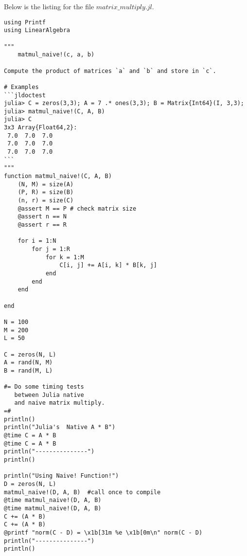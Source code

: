 \documentclass[a4paper,10pt,BCOR10mm,oneside,headsepline]{scrartcl}
\begin{document}
    


\newpage 
\noindent Below is the listing for the file $matrix\_multiply.jl$.

\begin{lstlisting}
using Printf
using LinearAlgebra

"""
    matmul_naive!(c, a, b)

Compute the product of matrices `a` and `b` and store in `c`.

# Examples
```jldoctest
julia> C = zeros(3,3); A = 7 .* ones(3,3); B = Matrix{Int64}(I, 3,3);
julia> matmul_naive!(C, A, B)
julia> C
3x3 Array{Float64,2}:
 7.0  7.0  7.0
 7.0  7.0  7.0
 7.0  7.0  7.0
```
"""
function matmul_naive!(C, A, B)
    (N, M) = size(A)
    (P, R) = size(B)
    (n, r) = size(C)
    @assert M == P # check matrix size
    @assert n == N
    @assert r == R

    for i = 1:N
        for j = 1:R
            for k = 1:M
                C[i, j] += A[i, k] * B[k, j]
            end
        end
    end

end

N = 100
M = 200
L = 50

C = zeros(N, L)
A = rand(N, M)
B = rand(M, L)

#= Do some timing tests
   between Julia native
   and naive matrix multiply.
=#
println()
println("Julia's  Native A * B")
@time C = A * B
@time C = A * B
println("---------------")
println()

println("Using Naive! Function!")
D = zeros(N, L)
matmul_naive!(D, A, B)  #call once to compile
@time matmul_naive!(D, A, B)
@time matmul_naive!(D, A, B)
C += (A * B)
C += (A * B)
@printf "norm(C - D) = \x1b[31m %e \x1b[0m\n" norm(C - D)
println("---------------")
println()
\end{lstlisting}
\end{document}
